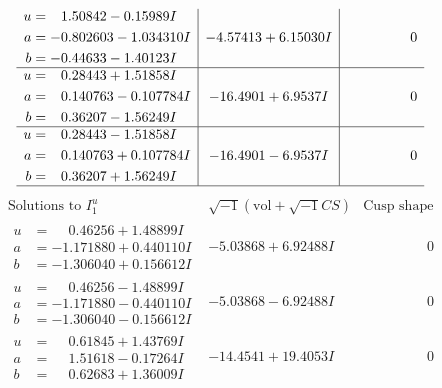 \documentclass[1p]{elsarticle_modified}
\theoremstyle{definition}
\newcommand{\I}{\sqrt{-1}}
\begin{document}
$$\begin{array}{c|c|c}
\begin{aligned}
u &= \phantom{-}1.50842 - 0.15989 I \\
a &= -0.802603 - 1.034310 I \\
b &= -0.44633 - 1.40123 I\end{aligned}
 & -4.57413 + 6.15030 I & \phantom{-0.000000 } 0 \\ \hline\begin{aligned}
u &= \phantom{-}0.28443 + 1.51858 I \\
a &= \phantom{-}0.140763 - 0.107784 I \\
b &= \phantom{-}0.36207 - 1.56249 I\end{aligned}
 & -16.4901 + 6.9537 I & \phantom{-0.000000 } 0 \\ \hline\begin{aligned}
u &= \phantom{-}0.28443 - 1.51858 I \\
a &= \phantom{-}0.140763 + 0.107784 I \\
b &= \phantom{-}0.36207 + 1.56249 I\end{aligned}
 & -16.4901 - 6.9537 I & \phantom{-0.000000 } 0\\
 \hline 
 \end{array}$$\newpage$$\begin{array}{c|c|c}  
\text{Solutions to }I^u_{1}& \I (\text{vol} + \sqrt{-1}CS) & \text{Cusp shape}\\
 \hline 
\begin{aligned}
u &= \phantom{-}0.46256 + 1.48899 I \\
a &= -1.171880 + 0.440110 I \\
b &= -1.306040 + 0.156612 I\end{aligned}
 & -5.03868 + 6.92488 I & \phantom{-0.000000 } 0 \\ \hline\begin{aligned}
u &= \phantom{-}0.46256 - 1.48899 I \\
a &= -1.171880 - 0.440110 I \\
b &= -1.306040 - 0.156612 I\end{aligned}
 & -5.03868 - 6.92488 I & \phantom{-0.000000 } 0 \\ \hline\begin{aligned}
u &= \phantom{-}0.61845 + 1.43769 I \\
a &= \phantom{-}1.51618 - 0.17264 I \\
b &= \phantom{-}0.62683 + 1.36009 I\end{aligned}
 & -14.4541 + 19.4053 I & \phantom{-0.000000 } 0 \\ \hline\begin{aligned}

\end{aligned}
\end{array}$$
\end{document}
